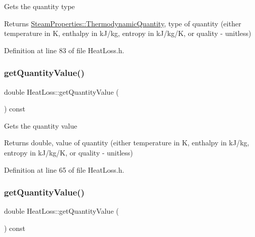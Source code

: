 Gets the quantity type \begin{DoxyReturn}{Returns}
\hyperlink{class_steam_properties_ae0294bedf7d178c2d8fb6aed0f62fbff}{Steam\+Properties\+::\+Thermodynamic\+Quantity}, type of quantity (either temperature in K, enthalpy in k\+J/kg, entropy in k\+J/kg/K, or quality -\/ unitless) 
\end{DoxyReturn}


Definition at line 83 of file Heat\+Loss.\+h.

\mbox{\label{class_heat_loss_a7f7fd85e4fc8bf96dcc213f3dd44ecf7}} 
\subsubsection{\texorpdfstring{get\+Quantity\+Value()}{getQuantityValue()}\hspace{0.1cm}{\footnotesize\ttfamily [1/3]}}
{\footnotesize\ttfamily double Heat\+Loss\+::get\+Quantity\+Value (\begin{DoxyParamCaption}{ }\end{DoxyParamCaption}) const\hspace{0.3cm}{\ttfamily [inline]}}

Gets the quantity value \begin{DoxyReturn}{Returns}
double, value of quantity (either temperature in K, enthalpy in k\+J/kg, entropy in k\+J/kg/K, or quality -\/ unitless) 
\end{DoxyReturn}


Definition at line 65 of file Heat\+Loss.\+h.

\mbox{\label{class_heat_loss_a7f7fd85e4fc8bf96dcc213f3dd44ecf7}} 
\subsubsection{\texorpdfstring{get\+Quantity\+Value()}{getQuantityValue()}\hspace{0.1cm}{\footnotesize\ttfamily [2/3]}}
{\footnotesize\ttfamily double Heat\+Loss\+::get\+Quantity\+Value (\begin{DoxyParamCaption}{ }\end{DoxyParamCaption}) const\hspace{0.3cm}{\ttfamily [inline]}}

